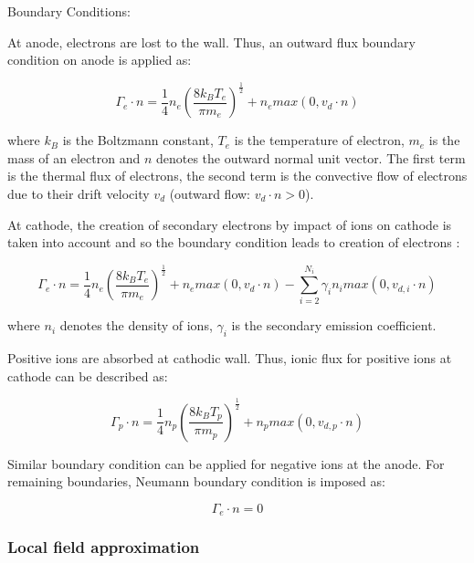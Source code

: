 \documentclass[paper=a4, fontsize=13pt]{scrartcl}
\begin{document}
Boundary Conditions:

At anode, electrons are lost to the wall. Thus, an outward flux boundary condition on anode is applied as:

\begin{equation} \label{eq:BC anode transport }
\Gamma_e \cdot n = \frac{1}{4} n_e (\frac{8 k_B T_e}{\pi m_e})^{\frac{1}{2}} + n_e max(0, v_d \cdot n )
\end{equation}

where $k_B$ is the Boltzmann constant, $T_e$ is the temperature of electron, $m_e$ is the mass of an electron and $n$ denotes the outward normal unit vector. The first term is the thermal flux of electrons, the second term is the convective flow of electrons due to their drift velocity $v_d$ (outward flow: $v_d \cdot n > 0 $). 

At cathode, the creation of secondary electrons by impact of ions on cathode is taken into account and so the boundary condition leads to creation of electrons :

\begin{equation} \label{eq:BC cathode transport}
\Gamma_e \cdot n = \frac{1}{4} n_e (\frac{8 k_B T_e}{\pi m_e})^{\frac{1}{2}} + n_e max(0, v_d \cdot n ) - \sum_{i=2}^{N_i} \gamma_i n_i max(0, v_{d,i} \cdot n )
\end{equation}

where $n_i$ denotes the density of ions, $\gamma_i$ is the secondary emission coefficient.

Positive ions are absorbed at cathodic wall. Thus, ionic flux for positive ions at cathode can be described as:

\begin{equation} \label{eq:BC cathode positive transport}
\Gamma_p \cdot n = \frac{1}{4} n_p (\frac{8 k_B T_p}{\pi m_p})^{\frac{1}{2}} + n_p max(0, v_{d,p} \cdot n )
\end{equation}

Similar boundary condition can be applied for negative ions at the anode. For remaining boundaries, Neumann boundary condition is imposed as:

\begin{equation} \label{eq:BC anode negative transport}
\Gamma_e \cdot n = 0
\end{equation}

\subsubsection{Local field approximation}
\end{document}
